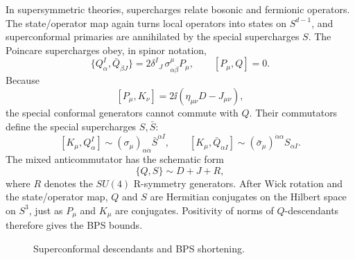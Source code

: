 In supersymmetric theories, supercharges relate bosonic and fermionic
operators.  The state/operator map again turns local operators into
states on \(S^{d-1}\), and superconformal primaries are annihilated by
the special supercharges \(S\).
The Poincare supercharges obey, in spinor notation,
\[
  \{Q^I_\alpha,\bar Q_{\dot\beta J}\}
  =
  2\delta^I{}_J\,\sigma^\mu_{\alpha\dot\beta}P_\mu,
  \qquad
  [P_\mu,Q]=0.
\]
Because
\[
  [P_\mu,K_\nu]=2\ii(\eta_{\mu\nu}D-J_{\mu\nu}),
\]
the special conformal generators cannot commute with \(Q\).  Their
commutators define the special supercharges \(S,\bar S\):
\[
  [K_\mu,Q^I_\alpha]\sim(\sigma_\mu)_{\alpha\dot\alpha}\bar S^{\dot\alpha I},
  \qquad
  [K_\mu,\bar Q_{\dot\alpha I}]\sim
  (\bar\sigma_\mu)^{\dot\alpha\alpha}S_{\alpha I}.
\]
The mixed anticommutator has the schematic form
\[
  \{Q,S\}\sim D+J+R,
\]
where \(R\) denotes the \(SU(4)\) R-symmetry generators.  After Wick
rotation and the state/operator map, \(Q\) and \(S\) are Hermitian
conjugates on the Hilbert space on \(S^3\), just as \(P_\mu\) and
\(K_\mu\) are conjugates.  Positivity of norms of \(Q\)-descendants
therefore gives the BPS bounds.

\begin{figure}[htbp]
\centering
{}
\caption{Superconformal descendants and BPS shortening.}
\end{figure}

